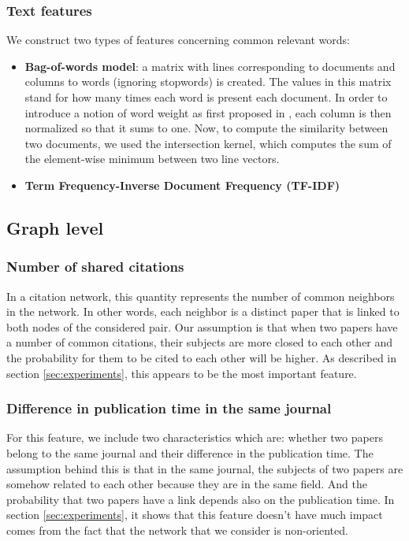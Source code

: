 \documentclass{article}
\begin{document}
\subsubsection{Text features}
We construct two types of features concerning common relevant words:
\begin{itemize}
\item \textbf{Bag-of-words model}: a matrix with lines corresponding to documents and columns to words (ignoring stopwords) is created. The values in this matrix stand for how many times each word is present each document. In order to introduce a notion of word weight as first proposed in \cite{sparck1972statistical}, each column is then normalized so that it sums to one. Now, to compute the similarity between two documents, we used the intersection kernel, which computes the sum of the element-wise minimum between two line vectors.
\item \textbf{Term Frequency-Inverse Document Frequency (TF-IDF)}
\end{itemize}
\subsection{Graph level}
\subsubsection{Number of shared citations}

In a citation network, this quantity represents the number of common neighbors in the network. In other words, each neighbor is a distinct paper that is linked to both nodes of the considered pair. Our assumption is that when two papers have a number of common citations, their subjects are more closed to each other and the probability for them to be cited to each other will be higher. As described in section \ref{sec:experiments}, this appears to be the most important feature.

\subsubsection{Difference in publication time in the same journal}

For this feature, we include two characteristics which are: whether two papers belong to the same journal and their difference in the publication time. The assumption behind this is that in the same journal, the subjects of two papers are somehow related to each other because they are in the same field. And the probability that two papers have a link depends also on the publication time. In section \ref{sec:experiments}, it shows that this feature doesn't have much impact comes from the fact that the network that we consider is non-oriented.
\end{document}
